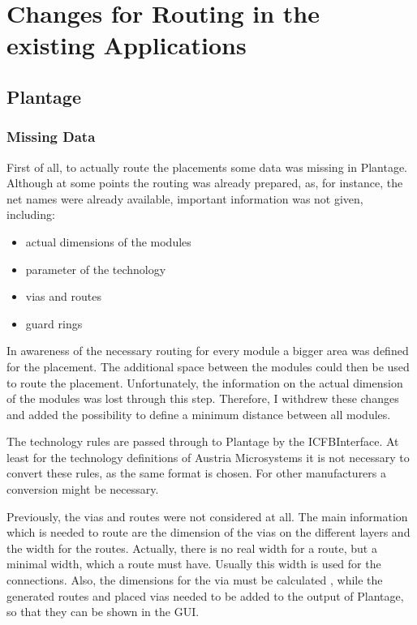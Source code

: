 \section{Changes for Routing in the existing Applications}

\subsection{Plantage}

\subsubsection{Missing Data}
First of all, to actually route the placements some data was missing in Plantage. Although at some points the routing was already prepared, as, for instance, the net names were already available, important information was not given, including:
\begin{itemize}
\item actual dimensions of the modules
\item parameter of the technology
\item vias and routes
\item guard rings
\end{itemize}

In awareness of the necessary routing for every module a bigger area was defined for the placement. The additional space between the modules could then be used to route the placement. Unfortunately, the information on the actual dimension of the modules was lost through this step. Therefore, I withdrew these changes and added the possibility to define a minimum distance between all modules.

The technology rules are passed through to Plantage by the ICFBInterface. At least for the technology definitions of Austria Microsystems it is not necessary to convert these rules, as the same format is chosen. For other manufacturers a conversion might be necessary.

Previously, the vias and routes were not considered at all. The main information which is needed to route are the dimension of the vias on the different layers and the width for the routes. Actually, there is no real width for a route, but a minimal width, which a route must have. Usually this width is used for the connections. Also, the dimensions for the via must be calculated , while the generated routes and placed vias needed to be added to the output of Plantage, so that they can be shown in the GUI.

